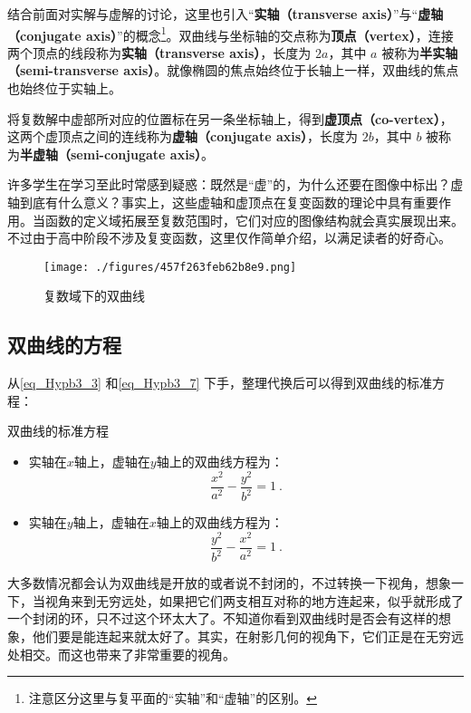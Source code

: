 结合前面对实解与虚解的讨论，这里也引入“\textbf{实轴（transverse axis）}”与“\textbf{虚轴（conjugate axis）}”的概念\footnote{注意区分这里与复平面的“实轴”和“虚轴”的区别。}。双曲线与坐标轴的交点称为\textbf{顶点（vertex）}，连接两个顶点的线段称为\textbf{实轴（transverse axis）}，长度为 $2a$，其中 $a$ 被称为\textbf{半实轴（semi-transverse axis）}。就像椭圆的焦点始终位于长轴上一样，双曲线的焦点也始终位于实轴上。

将复数解中虚部所对应的位置标在另一条坐标轴上，得到\textbf{虚顶点（co-vertex）}，这两个虚顶点之间的连线称为\textbf{虚轴（conjugate axis）}，长度为 $2b$，其中 $b$ 被称为\textbf{半虚轴（semi-conjugate axis）}。

许多学生在学习至此时常感到疑惑：既然是“虚”的，为什么还要在图像中标出？虚轴到底有什么意义？事实上，这些虚轴和虚顶点在复变函数的理论中具有重要作用。当函数的定义域拓展至复数范围时，它们对应的图像结构就会真实展现出来。不过由于高中阶段不涉及复变函数，这里仅作简单介绍，以满足读者的好奇心。

\begin{figure}[ht]
\centering
\texttt{[image: ./figures/457f263feb62b8e9.png]}
\caption{复数域下的双曲线} \label{fig_Hypb3_2}
\end{figure}

\subsection{双曲线的方程}

从\autoref{eq_Hypb3_3} 和\autoref{eq_Hypb3_7} 下手，整理代换后可以得到双曲线的标准方程：

\begin{theorem}{双曲线的标准方程}
\begin{itemize}
\item 实轴在$x$轴上，虚轴在$y$轴上的双曲线方程为：
\begin{equation}\label{eq_Hypb3_4}
\frac{x^2}{a^2} - \frac{y^2}{b^2} = 1~.
\end{equation}
\item 实轴在$y$轴上，虚轴在$x$轴上的双曲线方程为：
\begin{equation}
\frac{y^2}{b^2} -\frac{x^2}{a^2}  = 1~.
\end{equation}
\end{itemize}
\end{theorem}



大多数情况都会认为双曲线是开放的或者说不封闭的，不过转换一下视角，想象一下，当视角来到无穷远处，如果把它们两支相互对称的地方连起来，似乎就形成了一个封闭的环，只不过这个环太大了。不知道你看到双曲线时是否会有这样的想象，他们要是能连起来就太好了。其实，在射影几何的视角下，它们正是在无穷远处相交。而这也带来了非常重要的视角。

